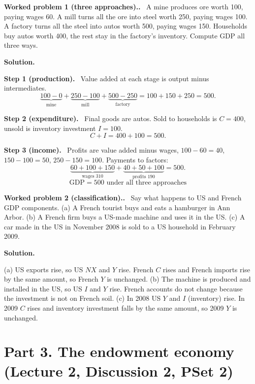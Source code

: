 \documentclass[12pt]{article}
\newcommand{\st}[1]{\par\smallskip\textbf{Step #1.}\ }
\newcommand{\ans}[1]{\[\boxed{\ #1\ }\]}
\newcommand{\prob}[1]{\par\bigskip\textbf{Worked problem #1.}\ }
\newcommand{\sol}{\par\smallskip\textbf{Solution.}\par}
\begin{document}
\prob{1 (three approaches).} A mine produces ore worth 100, paying wages 60.
A mill turns all the ore into steel worth 250, paying wages 100. A factory turns
all the steel into autos worth 500, paying wages 150. Households buy autos
worth 400, the rest stay in the factory's inventory. Compute GDP all three ways.
\sol
\st{1 (production)} Value added at each stage is output minus intermediates.
\[
\underbrace{100-0}_{\text{mine}}+\underbrace{250-100}_{\text{mill}}+\underbrace{500-250}_{\text{factory}}=100+150+250=500 .
\]
\st{2 (expenditure)} Final goods are autos. Sold to households is $C=400$, unsold
is inventory investment $I=100$.
\[
C+I=400+100=500 .
\]
\st{3 (income)} Profits are value added minus wages, $100-60=40$,
$150-100=50$, $250-150=100$. Payments to factors:
\[
\underbrace{60+100+150}_{\text{wages }310}+\underbrace{40+50+100}_{\text{profits }190}=500 .
\]
\ans{\text{GDP}=500\text{ under all three approaches}}

\prob{2 (classification).} Say what happens to US and French GDP components.
(a) A French tourist buys and eats a hamburger in Ann Arbor. (b) A French firm
buys a US-made machine and uses it in the US. (c) A car made in the US in
November 2008 is sold to a US household in February 2009.
\sol
(a) US exports rise, so US $NX$ and $Y$ rise. French $C$ rises and French
imports rise by the same amount, so French $Y$ is unchanged.
(b) The machine is produced and installed in the US, so US $I$ and $Y$ rise.
French accounts do not change because the investment is not on French soil.
(c) In 2008 US $Y$ and $I$ (inventory) rise. In 2009 $C$ rises and inventory
investment falls by the same amount, so 2009 $Y$ is unchanged.

\section*{Part 3. The endowment economy (Lecture 2, Discussion 2, PSet 2)}
\end{document}
